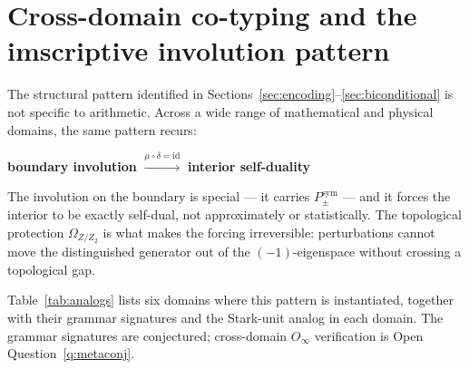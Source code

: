 \documentclass[12pt]{article}
\theoremstyle{plain}
\theoremstyle{definition}
\theoremstyle{remark}
\begin{document}
\section{Cross-domain co-typing and the imscriptive involution pattern}
\label{sec:crossdomain}

The structural pattern identified in Sections~\ref{sec:encoding}--\ref{sec:biconditional}
is not specific to arithmetic. Across a wide range of mathematical and physical domains, the
same pattern recurs:

\begin{center}
\textbf{boundary involution}
$\xrightarrow{\mu \circ \delta = \mathrm{id}}$
\textbf{interior self-duality}
\end{center}

The involution on the boundary is special — it carries $P_{\pm}^{\text{sym}}$ — and it forces
the interior to be exactly self-dual, not approximately or statistically. The topological
protection $\Omega_{Z/Z_2}$ is what makes the forcing irreversible: perturbations cannot move
the distinguished generator out of the $(-1)$-eigenspace without crossing a topological gap.

Table~\ref{tab:analogs} lists six domains where this pattern is instantiated, together with
their grammar signatures and the Stark-unit analog in each domain. The grammar signatures are
conjectured; cross-domain $O_\infty$ verification is Open Question~\ref{q:metaconj}.
\end{document}
